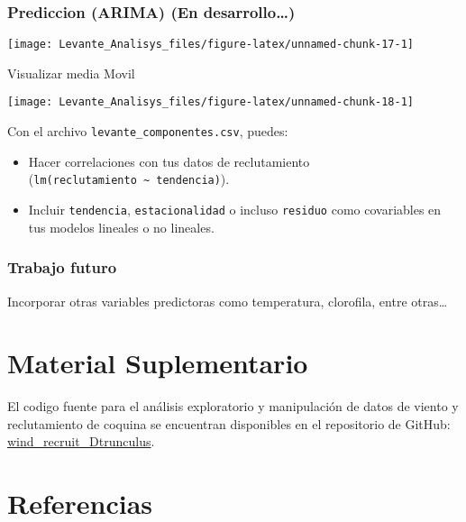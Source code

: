 \documentclass[
]{article}
\providecommand{\tightlist}{%
  \setlength{\itemsep}{0pt}\setlength{\parskip}{0pt}}
\begin{document}
\subsubsection{Prediccion (ARIMA) (En desarrollo\ldots)}\label{prediccion-arima-en-desarrollo}

\begin{center}\texttt{[image: Levante\_Analisys\_files/figure-latex/unnamed-chunk-17-1]} \end{center}

Visualizar media Movil

\begin{center}\texttt{[image: Levante\_Analisys\_files/figure-latex/unnamed-chunk-18-1]} \end{center}

Con el archivo \texttt{levante\_componentes.csv}, puedes:

\begin{itemize}
\tightlist
\item
  Hacer correlaciones con tus datos de reclutamiento (\texttt{lm(reclutamiento\ \textasciitilde{}\ tendencia)}).
\item
  Incluir \texttt{tendencia}, \texttt{estacionalidad} o incluso \texttt{residuo} como covariables en tus modelos lineales o no lineales.
\end{itemize}

\subsubsection{Trabajo futuro}\label{trabajo-futuro}

Incorporar otras variables predictoras como temperatura, clorofila, entre otras\ldots{}

\newpage

\section{Material Suplementario}\label{material-suplementario}

El codigo fuente para el análisis exploratorio y manipulación de datos de viento y reclutamiento de coquina se encuentran disponibles en el repositorio de GitHub: \href{https://github.com/MauroMardones/wind-recruitment-Dtrunculus}{wind\_recruit\_Dtrunculus}.

\newpage

\section*{Referencias}\label{referencias}
\end{document}
